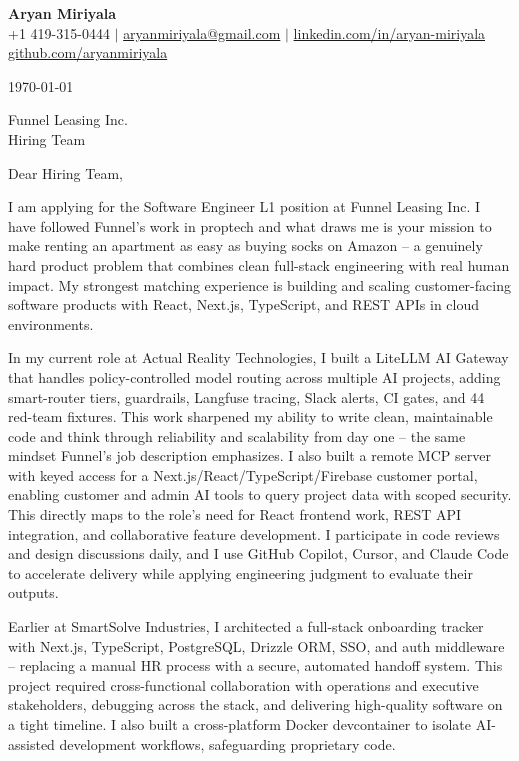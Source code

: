 \documentclass[letterpaper,11pt]{article}
\begin{document}
\begin{center}
  {\LARGE \textbf{Aryan Miriyala}}\\[2pt]
  \small
  +1 419-315-0444 $|$ \href{mailto:aryanmiriyala@gmail.com}{aryanmiriyala@gmail.com} $|$ \href{https://www.linkedin.com/in/aryan-miriyala-7788a21b6/}{linkedin.com/in/aryan-miriyala}\\
  \href{https://github.com/aryanmiriyala}{github.com/aryanmiriyala}
\end{center}\vspace{12pt}

\today

\vspace{12pt}

Funnel Leasing Inc.\\
Hiring Team

\vspace{12pt}

Dear Hiring Team,

I am applying for the Software Engineer L1 position at Funnel Leasing Inc. I have followed Funnel's work in proptech and what draws me is your mission to make renting an apartment as easy as buying socks on Amazon -- a genuinely hard product problem that combines clean full-stack engineering with real human impact. My strongest matching experience is building and scaling customer-facing software products with React, Next.js, TypeScript, and REST APIs in cloud environments.

In my current role at Actual Reality Technologies, I built a LiteLLM AI Gateway that handles policy-controlled model routing across multiple AI projects, adding smart-router tiers, guardrails, Langfuse tracing, Slack alerts, CI gates, and 44 red-team fixtures. This work sharpened my ability to write clean, maintainable code and think through reliability and scalability from day one -- the same mindset Funnel's job description emphasizes. I also built a remote MCP server with keyed access for a Next.js/React/TypeScript/Firebase customer portal, enabling customer and admin AI tools to query project data with scoped security. This directly maps to the role's need for React frontend work, REST API integration, and collaborative feature development. I participate in code reviews and design discussions daily, and I use GitHub Copilot, Cursor, and Claude Code to accelerate delivery while applying engineering judgment to evaluate their outputs.

Earlier at SmartSolve Industries, I architected a full-stack onboarding tracker with Next.js, TypeScript, PostgreSQL, Drizzle ORM, SSO, and auth middleware -- replacing a manual HR process with a secure, automated handoff system. This project required cross-functional collaboration with operations and executive stakeholders, debugging across the stack, and delivering high-quality software on a tight timeline. I also built a cross-platform Docker devcontainer to isolate AI-assisted development workflows, safeguarding proprietary code.
\end{document}
